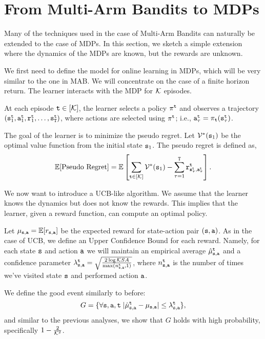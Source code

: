 \section{From Multi-Arm Bandits to MDPs}

Many of the techniques used in the case of Multi-Arm Bandits can naturally be extended  to the case of MDPs. In this section, we sketch a simple extension where the dynamics of the MDPs are known, but the rewards are unknown.

We first need to define the model for online learning in MDPs, which will be very similar to the one in MAB. We will concentrate on the case of a finite horizon return. The learner interacts with the MDP for $\mathcal K$ episodes.

At each episode ${\tt t}\in[\mathcal K]$, the learner selects a policy $\pi^{\tt t}$ and observes a trajectory $({\tt s}^{\tt t}_1, {\tt a}^{\tt t}_1,{\tt r}^{\tt t}_1 , \ldots , {\tt s}_{\tt T}^{\tt t})$, where actions are selected using $\pi^{\tt t}$; i.e., ${\tt a}_\tau^{\tt t}=\pi_{\tt t}({\tt s}_\tau^{\tt t})$.

The goal of the learner is to minimize the pseudo regret. Let $\mathcal{V}^*({\tt s}_1)$ be the optimal value function from the initial state ${\tt s}_1$. The pseudo regret is defined as,
\[
\mathbb{E}[\text{Pseudo Regret}] = \mathbb{E}\left[\sum_{{\tt t}\in[\mathcal K]}\mathcal{V}^*({\tt s}_1)-\sum_{\tau=1}^{\tt T} {\tt r}^{\tt t}_{{\tt s}_\tau^{\tt t},{\tt a}_\tau^{\tt t}}\right].
\]

We now want to introduce a UCB-like algorithm. We   assume that the learner knows the dynamics but does not know the rewards. This implies that the learner, given a reward function, can compute an optimal policy.

Let $\mu_{{\tt s},{\tt a}}=\mathbb{E}[r_{{\tt s},{\tt a}}]$ be the expected reward for state-action pair $({\tt s},{\tt a})$.
%
As in the case of UCB, we  define an Upper Confidence Bound for each reward. Namely, for each state ${\tt s}$ and action ${\tt a}$ we will maintain an empirical average $\hat{\mu}^{\tt t}_{{\tt s},{\tt a}}$ and a confidence parameter $\lambda^{\tt t}_{{\tt s},{\tt a}}=\sqrt{\frac{2\log \mathcal K SA}{\max(n_{{\tt s},{\tt a}}^{\tt t},1)}}$, where $n_{{\tt s},{\tt a}}^{\tt t}$ is the number of times we've visited state ${\tt s}$ and performed action ${\tt a}$.

We define the good event similarly to before:
\[
G=\{\forall{\tt s},{\tt a}, {\tt t}\; |\hat{\mu}^{\tt t}_{{\tt s},{\tt a}}-\mu_{{\tt s},{\tt a}}|\leq \lambda_{{\tt s},{\tt a}}^{\tt t}\},
\]
and similar to the previous analyses, we show that $G$ holds with high probability, specifically $1-\frac{2}{\mathcal K^2}$.

